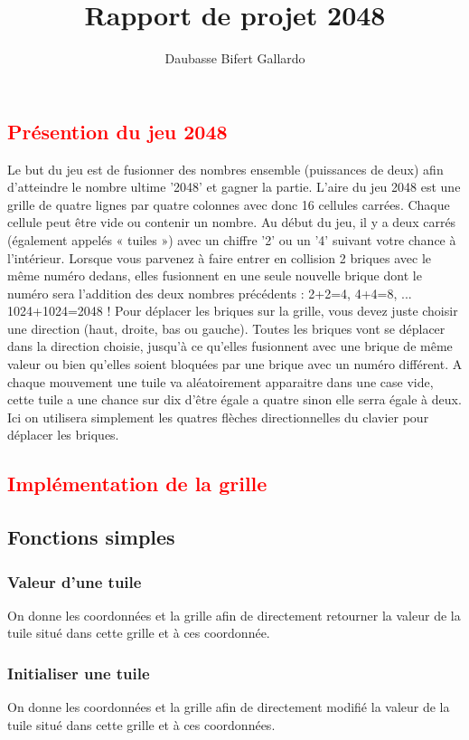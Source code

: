 \documentclass{article}
\title{Rapport de projet 2048}
\author{Daubasse Bifert Gallardo}
\begin{document}
\maketitle
\tableofcontents
\textcolor{red}{\section{Présention du jeu 2048}}
Le but du jeu est de fusionner des nombres ensemble (puissances de deux) afin d'atteindre le nombre ultime '2048' et gagner la partie.
L'aire du jeu 2048 est une grille de quatre lignes par quatre colonnes avec donc 16 cellules carrées. Chaque cellule peut être vide ou contenir un nombre. Au début du jeu, il y a deux carrés (également appelés « tuiles ») avec un chiffre '2' ou un '4' suivant votre chance à l'intérieur.
Lorsque vous parvenez à faire entrer en collision 2 briques avec le même numéro dedans, elles fusionnent en une seule nouvelle brique dont le numéro sera l'addition des deux nombres précédents : 2+2=4, 4+4=8, ... 1024+1024=2048 !
Pour déplacer les briques sur la grille, vous devez juste choisir une direction (haut, droite, bas ou gauche). Toutes les briques vont se déplacer dans la direction choisie, jusqu'à ce qu'elles fusionnent avec une brique de même valeur ou bien qu'elles soient bloquées par une brique avec un numéro différent. A chaque mouvement une tuile va aléatoirement apparaitre dans une case vide, cette tuile a une chance sur dix d'être égale a quatre sinon elle serra égale à deux.
Ici on utilisera simplement les quatres flèches directionnelles du clavier pour déplacer les briques.
\textcolor{red}{\section{Implémentation de la grille}}
\subsection{Fonctions simples}
\subsubsection{Valeur d'une tuile}
On donne les coordonnées et la grille afin de directement retourner la valeur de la tuile situé dans cette grille et à ces coordonnée.
\subsubsection{Initialiser une tuile}
On donne les coordonnées et la grille afin de directement modifié la valeur de la tuile situé dans cette grille et à ces coordonnées.
\end{document}
